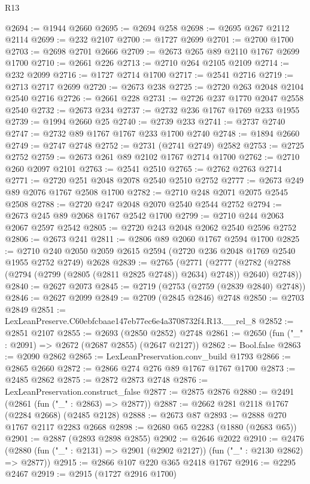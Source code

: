 \begin{lexlean}{R13}
\begin{coremodule}
@2694 := @1944 @2660
@2695 := @2694 @258
@2698 := @2695 @267 @2112 @2114
@2699 := @232 @2107
@2700 := @1727 @2699
@2701 := @2700 @1700
@2703 := @2698 @2701 @2666
@2709 := @2673 @265 @89 @2110 @1767 @2699 @1700
@2710 := @2661 @226
@2713 := @2710 @264 @2105 @2109
@2714 := @232 @2099
@2716 := @1727 @2714 @1700
@2717 := @2541 @2716
@2719 := @2713 @2717 @2699
@2720 := @2673 @238
@2725 := @2720 @263 @2048 @2104 @2540 @2716
@2726 := @2661 @228
@2731 := @2726 @237 @1770 @2047 @2558 @2540
@2732 := @2673 @234
@2737 := @2732 @236 @1767 @1769 @233 @1955
@2739 := @1994 @2660 @25
@2740 := @2739 @233
@2741 := @2737 @2740
@2747 := @2732 @89 @1767 @1767 @233 @1700 @2740
@2748 := @1894 @2660
@2749 := @2747 @2748
@2752 := @2731 (@2741 @2749) @2582
@2753 := @2725 @2752
@2759 := @2673 @261 @89 @2102 @1767 @2714 @1700
@2762 := @2710 @260 @2097 @2101
@2763 := @2541 @2510
@2765 := @2762 @2763 @2714
@2771 := @2720 @251 @2048 @2078 @2540 @2510 @2752
@2777 := @2673 @249 @89 @2076 @1767 @2508 @1700
@2782 := @2710 @248 @2071 @2075 @2545 @2508
@2788 := @2720 @247 @2048 @2070 @2540 @2544 @2752
@2794 := @2673 @245 @89 @2068 @1767 @2542 @1700
@2799 := @2710 @244 @2063 @2067 @2597 @2542
@2805 := @2720 @243 @2048 @2062 @2540 @2596 @2752
@2806 := @2673 @241
@2811 := @2806 @89 @2060 @1767 @2594 @1700
@2825 := @2710 @240 @2050 @2059 @2615 @2594 (@2720 @236 @2048 @1769 @2540 @1955 @2752 @2749) @2628
@2839 := @2765
    (@2771
      (@2777 (@2782 (@2788 (@2794 (@2799 (@2805 (@2811 @2825 @2748)) @2634) @2748)) @2640) @2748))
@2840 := @2627 @2073
@2845 := @2719 (@2753 (@2759 (@2839 @2840) @2748))
@2846 := @2627 @2099
@2849 := @2709 (@2845 @2846) @2748
@2850 := @2703 @2849
@2851 := LexLeanPreserve.C60ebfcbaae147eb77ec6e4a3708732f4.R13.__rel_8
@2852 := @2851 @2107
@2855 := @2693 (@2850 @2852) @2748
@2861 := @2650 (fun ("_" : @2091) => @2672 (@2687 @2855) (@2647 @2127))
@2862 := Bool.false
@2863 := @2090 @2862
@2865 := LexLeanPreservation.conv_build @1793
@2866 := @2865 @2660
@2872 := @2866 @274 @276 @89 @1767 @1767 @1700
@2873 := @2485 @2862
@2875 := @2872 @2873 @2748
@2876 := LexLeanPreservation.construct_false
@2877 := @2875 @2876
@2880 := @2491 (@2861 (fun ("_" : @2863) => @2877))
@2887 := @2662 @281 @2118 @1767 (@2284 @2668) (@2485 @2128)
@2888 := @2673 @87
@2893 := @2888 @270 @1767 @2117 @2283 @2668
@2898 := @2680 @65 @2283 (@1880 (@2683 @65))
@2901 := @2887 (@2893 @2898 @2855)
@2902 := @2646 @2022
@2910 := @2476 (@2880 (fun ("_" : @2131) => @2901 (@2902 @2127)) (fun ("_" : @2130 @2862) => @2877))
@2915 := @2866 @107 @220 @365 @2418 @1767
@2916 := @2295 @2467
@2919 := @2915 (@1727 @2916 @1700)

\end{coremodule}
\end{lexlean}
